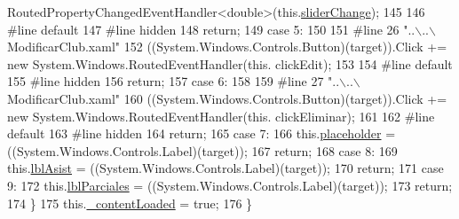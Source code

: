 \begin{DoxyCode}
      RoutedPropertyChangedEventHandler<\textcolor{keywordtype}{double}>(this.\hyperlink{class_asistencias__wpf_1_1_modificar_club_a16e4ed6700460777f30a494ee9eb0680}{sliderChange});
145             
146 \textcolor{preprocessor}{            #line default}
147 \textcolor{preprocessor}{}\textcolor{preprocessor}{            #line hidden}
148 \textcolor{preprocessor}{}            \textcolor{keywordflow}{return};
149             \textcolor{keywordflow}{case} 5:
150             
151 \textcolor{preprocessor}{            #line 26 "..\(\backslash\)..\(\backslash\)ModificarClub.xaml"}
152 \textcolor{preprocessor}{}            ((System.Windows.Controls.Button)(target)).Click += \textcolor{keyword}{new} System.Windows.RoutedEventHandler(\textcolor{keyword}{this}.
      clickEdit);
153             
154 \textcolor{preprocessor}{            #line default}
155 \textcolor{preprocessor}{}\textcolor{preprocessor}{            #line hidden}
156 \textcolor{preprocessor}{}            \textcolor{keywordflow}{return};
157             \textcolor{keywordflow}{case} 6:
158             
159 \textcolor{preprocessor}{            #line 27 "..\(\backslash\)..\(\backslash\)ModificarClub.xaml"}
160 \textcolor{preprocessor}{}            ((System.Windows.Controls.Button)(target)).Click += \textcolor{keyword}{new} System.Windows.RoutedEventHandler(\textcolor{keyword}{this}.
      clickEliminar);
161             
162 \textcolor{preprocessor}{            #line default}
163 \textcolor{preprocessor}{}\textcolor{preprocessor}{            #line hidden}
164 \textcolor{preprocessor}{}            \textcolor{keywordflow}{return};
165             \textcolor{keywordflow}{case} 7:
166             this.\hyperlink{class_asistencias__wpf_1_1_modificar_club_a2b2c3976252b8870397a47d96673c856}{placeholder} = ((System.Windows.Controls.Label)(target));
167             \textcolor{keywordflow}{return};
168             \textcolor{keywordflow}{case} 8:
169             this.\hyperlink{class_asistencias__wpf_1_1_modificar_club_ac5bdd9fd539f35d3f2e5fbd928913db5}{lblAsist} = ((System.Windows.Controls.Label)(target));
170             \textcolor{keywordflow}{return};
171             \textcolor{keywordflow}{case} 9:
172             this.\hyperlink{class_asistencias__wpf_1_1_modificar_club_a898ac5359d41d715dbfb86b46a84a39f}{lblParciales} = ((System.Windows.Controls.Label)(target));
173             \textcolor{keywordflow}{return};
174             \}
175             this.\hyperlink{class_asistencias__wpf_1_1_modificar_club_a1a23f498d37b0f95f283e2b650e396ba}{\_contentLoaded} = \textcolor{keyword}{true};
176         \}
\end{DoxyCode}
